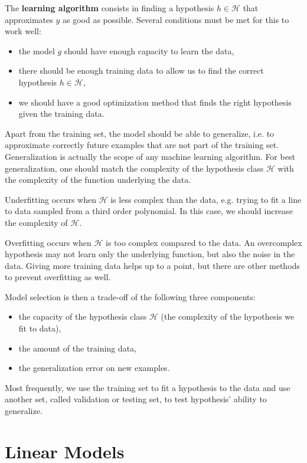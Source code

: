\documentclass[a4paper,11pt]{report}
\begin{document}
The \textbf{learning algorithm} consists in finding a hypothesis $h \in \mathcal{H}$ that approximates $y$ as good as possible. Several conditions must be met for this to work well:
\begin{itemize}
  \item the model $g$ should have enough capacity to learn the data,
  \item there should be enough training data to allow us to find the correct hypothesis $h \in \mathcal{H}$,
  \item we should have a good optimization method that finds the right hypothesis given the training data.
\end{itemize}

Apart from the training set, the model should be able to generalize, i.e. to approximate correctly future examples that are not part of the training set. Generalization is actually the scope of any machine learning algorithm. For best generalization, one should match the complexity of the hypothesis class $\mathcal{H}$ with the complexity of the function underlying the data.

Underfitting occurs when $\mathcal{H}$ is less complex than the data, e.g. trying to fit a line to data sampled from a third order polynomial. In this case, we should increase the complexity of $\mathcal{H}$.

Overfitting occurs when $\mathcal{H}$ is too complex compared to the data. An overcomplex hypothesis may not learn only the underlying function, but also the noise in the data. Giving more training data helps up to a point, but there are other methods to prevent overfitting as well.

Model selection is then a trade-off of the following three components:
\begin{itemize}
  \item the capacity of the hypothesis class $\mathcal{H}$ (the complexity of the hypothesis we fit to data),
  \item the amount of the training data,
  \item the generalization error on new examples.
\end{itemize}

Most frequently, we use the training set to fit a hypothesis to the data and use another set, called validation or testing set, to test hypothesis' ability to generalize.


\chapter{Linear Models}
\end{document}
